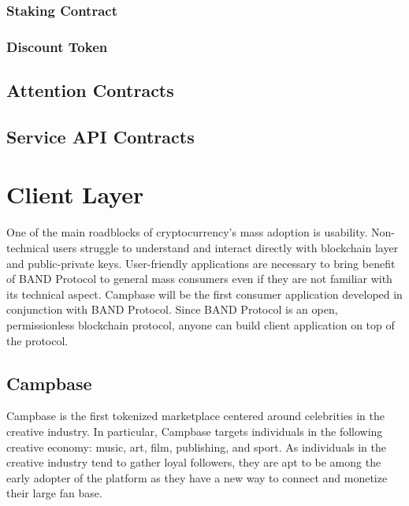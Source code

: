 \documentclass[letterpaper,11pt]{article}
\begin{document}
\subsubsection{Staking Contract}

\subsubsection{Discount Token}

\subsection{Attention Contracts}

\subsection{Service API Contracts}

\section{Client Layer}
One of the main roadblocks of cryptocurrency's mass adoption is usability. Non-technical users struggle to understand and interact directly with blockchain layer and public-private keys. User-friendly applications are necessary to bring benefit of BAND Protocol to general mass consumers even if they are not familiar with its technical aspect. Campbase will be the first consumer application developed in conjunction with BAND Protocol. Since BAND Protocol is an open, permissionless blockchain protocol, anyone can build client application on top of the protocol.

\subsection{Campbase}
Campbase is the first tokenized marketplace centered around celebrities in the creative industry. In particular, Campbase targets individuals in the following creative economy: music, art, film, publishing, and sport. As individuals in the creative industry tend to gather loyal followers, they are apt to be among the early adopter of the platform as they have a new way to connect and monetize their large fan base.
\end{document}
